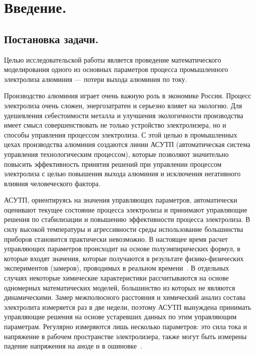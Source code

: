 \documentclass{article}
\begin{document}


\newpage

\addto{}

\setcounter{tocdepth}{5}
\tableofcontents

\newpage

\section*{Введение.}

\subsection*{Постановка задачи.}

Целью исследовательской работы является проведение математического моделирования одного из основных параметров процесса промышленного электролиза алюминия — потери выхода алюминия по току.

Производство алюминия играет очень важную роль в экономике России. Процесс электролиза очень сложен, энергозатратен и серьезно влияет на экологию. Для удешевления себестоимости металла и улучшения экологичности производства имеет смысл совершенствовать не только устройство электролизера, но и способы управления процессом электролиза. С этой целью в промышленных цехах производства алюминия создаются линии АСУТП (автоматическая система управления технологическим процессом), которые позволяют значительно повысить эффективность принятия решений при управлении процессом электролиза с целью повышения выхода алюминия и исключения негативного влияния человеческого фактора.

АСУТП, ориентируясь на значения управляющих параметров, автоматически оценивают текущее состояние процесса электролиза и принимают управляющие решения по стабилизации и повышению эффективности процесса электролиза. В силу высокой температуры и агрессивности среды использование большинства приборов становится практически невозможно. В настоящее время расчет управляющих параметров происходит на основе полуэмпирических формул, в которые входят значения, которые получаются в результате физико-физических экспериментов (замеров), проводимых в реальном времени~\cite{litlink:kalmykov}. В отдельных случаях некоторые химические характеристики рассчитываются на основе одномерных математических моделей, большинство из которых не являются динамическими. Замер межполюсного расстояния и химический анализ состава электролита измеряется раз в две недели, поэтому АСУТП вынуждена принимать управляющие решения на основе устаревших данных по этим управляющим параметрам. Регулярно измеряются лишь несколько параметров: это сила тока и напряжение в рабочем пространстве электролизера, также могут быть измерены падение напряжения на аноде и в ошиновке~\cite{litlink:bibliogr}.
\end{document}
